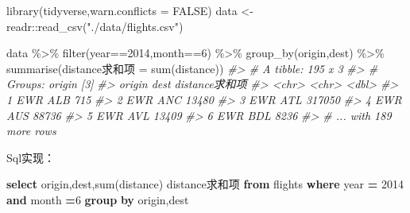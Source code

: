 \documentclass[
]{book}
\newenvironment{Shaded}{\begin{snugshade}}{\end{snugshade}}
\newcommand{\AttributeTok}[1]{\textcolor[rgb]{0.77,0.63,0.00}{#1}}
\newcommand{\CommentTok}[1]{\textcolor[rgb]{0.56,0.35,0.01}{\textit{#1}}}
\newcommand{\ConstantTok}[1]{\textcolor[rgb]{0.00,0.00,0.00}{#1}}
\newcommand{\DataTypeTok}[1]{\textcolor[rgb]{0.13,0.29,0.53}{#1}}
\newcommand{\DecValTok}[1]{\textcolor[rgb]{0.00,0.00,0.81}{#1}}
\newcommand{\FunctionTok}[1]{\textcolor[rgb]{0.00,0.00,0.00}{#1}}
\newcommand{\KeywordTok}[1]{\textcolor[rgb]{0.13,0.29,0.53}{\textbf{#1}}}
\newcommand{\NormalTok}[1]{#1}
\newcommand{\OperatorTok}[1]{\textcolor[rgb]{0.81,0.36,0.00}{\textbf{#1}}}
\newcommand{\OtherTok}[1]{\textcolor[rgb]{0.56,0.35,0.01}{#1}}
\newcommand{\SpecialCharTok}[1]{\textcolor[rgb]{0.00,0.00,0.00}{#1}}
\newcommand{\StringTok}[1]{\textcolor[rgb]{0.31,0.60,0.02}{#1}}
\begin{document}
\begin{Shaded}
\begin{Highlighting}[]
\FunctionTok{library}\NormalTok{(tidyverse,}\AttributeTok{warn.conflicts =} \ConstantTok{FALSE}\NormalTok{)}
\NormalTok{data }\OtherTok{\textless{}{-}}\NormalTok{ readr}\SpecialCharTok{::}\FunctionTok{read\_csv}\NormalTok{(}\StringTok{"./data/flights.csv"}\NormalTok{)}

\NormalTok{data }\SpecialCharTok{\%\textgreater{}\%} 
  \FunctionTok{filter}\NormalTok{(year}\SpecialCharTok{==}\DecValTok{2014}\NormalTok{,month}\SpecialCharTok{==}\DecValTok{6}\NormalTok{) }\SpecialCharTok{\%\textgreater{}\%} 
  \FunctionTok{group\_by}\NormalTok{(origin,dest) }\SpecialCharTok{\%\textgreater{}\%} 
  \FunctionTok{summarise}\NormalTok{(distance求和项 }\OtherTok{=} \FunctionTok{sum}\NormalTok{(distance))}
\CommentTok{\#\textgreater{} \# A tibble: 195 x 3}
\CommentTok{\#\textgreater{} \# Groups:   origin [3]}
\CommentTok{\#\textgreater{}   origin dest  distance求和项}
\CommentTok{\#\textgreater{}   \textless{}chr\textgreater{}  \textless{}chr\textgreater{}          \textless{}dbl\textgreater{}}
\CommentTok{\#\textgreater{} 1 EWR    ALB              715}
\CommentTok{\#\textgreater{} 2 EWR    ANC            13480}
\CommentTok{\#\textgreater{} 3 EWR    ATL           317050}
\CommentTok{\#\textgreater{} 4 EWR    AUS            88736}
\CommentTok{\#\textgreater{} 5 EWR    AVL            13409}
\CommentTok{\#\textgreater{} 6 EWR    BDL             8236}
\CommentTok{\#\textgreater{} \# ... with 189 more rows}
\end{Highlighting}
\end{Shaded}

Sql实现：

\begin{Shaded}
\begin{Highlighting}[]
\KeywordTok{select}\NormalTok{ origin,dest,}\FunctionTok{sum}\NormalTok{(distance) distance求和项 }\KeywordTok{from}\NormalTok{ flights }\KeywordTok{where} \DataTypeTok{year} \OperatorTok{=} \DecValTok{2014} \KeywordTok{and} \DataTypeTok{month} \OperatorTok{=}\DecValTok{6} \KeywordTok{group} \KeywordTok{by}\NormalTok{ origin,dest}
\end{Highlighting}
\end{Shaded}
\end{document}
